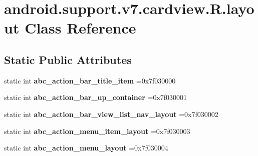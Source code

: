 \hypertarget{classandroid_1_1support_1_1v7_1_1cardview_1_1R_1_1layout}{}\section{android.\+support.\+v7.\+cardview.\+R.\+layout Class Reference}
\label{classandroid_1_1support_1_1v7_1_1cardview_1_1R_1_1layout}
\subsection*{Static Public Attributes}
\begin{DoxyCompactItemize}
\item 
\mbox{\label{classandroid_1_1support_1_1v7_1_1cardview_1_1R_1_1layout_a385885ce528d1bcf9cb8ad95f4e0c581}} 
static int {\bfseries abc\+\_\+action\+\_\+bar\+\_\+title\+\_\+item} =0x7f030000
\item 
\mbox{\label{classandroid_1_1support_1_1v7_1_1cardview_1_1R_1_1layout_a708781645566524a949dee65d1684409}} 
static int {\bfseries abc\+\_\+action\+\_\+bar\+\_\+up\+\_\+container} =0x7f030001
\item 
\mbox{\label{classandroid_1_1support_1_1v7_1_1cardview_1_1R_1_1layout_a0cb9276b0aceb13c57a2063e32006cfc}} 
static int {\bfseries abc\+\_\+action\+\_\+bar\+\_\+view\+\_\+list\+\_\+nav\+\_\+layout} =0x7f030002
\item 
\mbox{\label{classandroid_1_1support_1_1v7_1_1cardview_1_1R_1_1layout_a8d7890d60c5aec97e630daef970b14f0}} 
static int {\bfseries abc\+\_\+action\+\_\+menu\+\_\+item\+\_\+layout} =0x7f030003
\item 
\mbox{\label{classandroid_1_1support_1_1v7_1_1cardview_1_1R_1_1layout_afc036b98d67b219d5d52cc81c4fecb68}} 
static int {\bfseries abc\+\_\+action\+\_\+menu\+\_\+layout} =0x7f030004
\item 
\mbox{\label{classandroid_1_1support_1_1v7_1_1cardview_1_1R_1_1layout_a9cc36132035dd2b0e70bae4dc388e3fa}} 

\end{DoxyCompactItemize}
